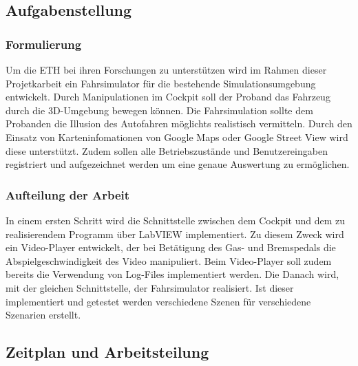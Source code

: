 \subsection{Aufgabenstellung}
\subsubsection{Formulierung}
Um die ETH bei ihren Forschungen zu unterstützen wird im Rahmen dieser Projetkarbeit ein Fahrsimulator für die bestehende Simulationsumgebung entwickelt. Durch Manipulationen im Cockpit soll der Proband das Fahrzeug durch die 3D-Umgebung bewegen können. Die Fahrsimulation sollte dem Probanden die Illusion des Autofahren möglichts realistisch vermitteln. Durch den Einsatz von Karteninfomationen von Google Maps oder Google Street View wird diese unterstützt. Zudem sollen alle Betriebszustände und Benutzereingaben registriert und aufgezeichnet werden um eine genaue Auswertung zu ermöglichen. 


\subsubsection{Aufteilung der Arbeit}
In einem ersten Schritt wird die Schnittstelle zwischen dem Cockpit und dem zu realisierendem Programm über LabVIEW implementiert. Zu diesem Zweck wird ein Video-Player entwickelt, der bei Betätigung des Gas- und Bremspedals die Abspielgeschwindigkeit des Video manipuliert. Beim Video-Player soll zudem bereits die Verwendung von Log-Files  implementiert werden. Die Danach wird, mit der gleichen Schnittstelle, der Fahrsimulator realisiert. Ist dieser implementiert und getestet werden verschiedene Szenen für verschiedene Szenarien erstellt. 


\subsection{Zeitplan und Arbeitsteilung}